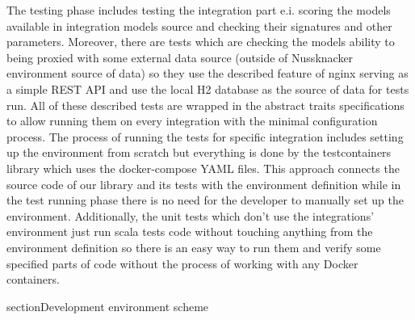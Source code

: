 The testing phase includes testing the integration part e.i. scoring the models available in integration
models source and checking their signatures and other parameters. Moreover, there are tests which are
checking the models ability to being proxied with some external data source (outside of Nussknacker
environment source of data) so they use the described feature of nginx serving as a simple REST API
and use the local H2 database as the source of data for tests run. All of these described tests are
wrapped in the abstract traits specifications to allow running them on every integration with the minimal
configuration process. The process of running the tests for specific integration includes setting up the
environment from scratch but everything is done by the testcontainers library which uses the docker-compose
YAML files. This approach connects the source code of our library and its tests with the environment
definition while in the test running phase there is no need for the developer to manually set up the
environment. Additionally, the unit tests which don’t use the integrations’ environment just run scala
tests code without touching anything from the environment definition so there is an easy way to run them
and verify some specified parts of code without the process of working with any Docker containers.

section{Development environment scheme}


